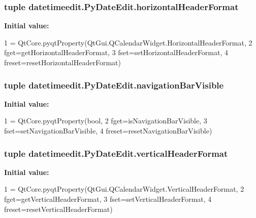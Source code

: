 \subsubsection[{horizontal\+Header\+Format}]{\setlength{\rightskip}{0pt plus 5cm}tuple datetimeedit.\+Py\+Date\+Edit.\+horizontal\+Header\+Format\hspace{0.3cm}{\ttfamily [static]}}\label{classdatetimeedit_1_1PyDateEdit_adc2af361e79a7d3a25fb686f9a86cae7}
{\bfseries Initial value\+:}
\begin{DoxyCode}
1 = QtCore.pyqtProperty(QtGui.QCalendarWidget.HorizontalHeaderFormat,
2                                                  fget=getHorizontalHeaderFormat,
3                                                  fset=setHorizontalHeaderFormat,
4                                                  freset=resetHorizontalHeaderFormat)
\end{DoxyCode}
\hypertarget{classdatetimeedit_1_1PyDateEdit_ad7d9b12d86daf81e035d75426ea06564}{}
\subsubsection[{navigation\+Bar\+Visible}]{\setlength{\rightskip}{0pt plus 5cm}tuple datetimeedit.\+Py\+Date\+Edit.\+navigation\+Bar\+Visible\hspace{0.3cm}{\ttfamily [static]}}\label{classdatetimeedit_1_1PyDateEdit_ad7d9b12d86daf81e035d75426ea06564}
{\bfseries Initial value\+:}
\begin{DoxyCode}
1 = QtCore.pyqtProperty(bool,
2                                                fget=isNavigationBarVisible,
3                                                fset=setNavigationBarVisible,
4                                                freset=resetNavigationBarVisible)
\end{DoxyCode}
\hypertarget{classdatetimeedit_1_1PyDateEdit_a9a82cb1f4010fe5f205bc7df3cd4e699}{}
\subsubsection[{vertical\+Header\+Format}]{\setlength{\rightskip}{0pt plus 5cm}tuple datetimeedit.\+Py\+Date\+Edit.\+vertical\+Header\+Format\hspace{0.3cm}{\ttfamily [static]}}\label{classdatetimeedit_1_1PyDateEdit_a9a82cb1f4010fe5f205bc7df3cd4e699}
{\bfseries Initial value\+:}
\begin{DoxyCode}
1 = QtCore.pyqtProperty(QtGui.QCalendarWidget.VerticalHeaderFormat,
2                                                fget=getVerticalHeaderFormat,
3                                                fset=setVerticalHeaderFormat,
4                                                freset=resetVerticalHeaderFormat)
\end{DoxyCode}


